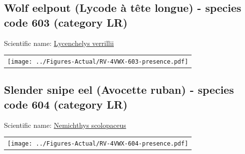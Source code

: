 \documentclass[12pt]{article}\usepackage[]{graphicx}\usepackage[]{color}
\begin{document}
\renewcommand\thefigure{\thesubsection\Alph{figure}}

\setcounter{figure}{0}

\hypertarget{sec:603}{%
\subsection{Wolf eelpout (Lycode à tête longue) - species code 603 (category LR)}\label{sec:603}}

  


Scientific name: \href{http://www.marinespecies.org/aphia.php?p=taxdetails\&id=159258}{Lycenchelys verrillii} \newline
\begin{minipage}{1.0\textwidth}
 \begin{tabular}{c}
\texttt{[image: ../Figures-Actual/RV-4VWX-603-presence.pdf]} \\ 
\end{tabular} 
\end{minipage}
\clearpage

\renewcommand\thefigure{\thesubsection\Alph{figure}}

\setcounter{figure}{0}

\hypertarget{sec:604}{%
\subsection{Slender snipe eel (Avocette ruban) - species code 604 (category LR)}\label{sec:604}}

  


Scientific name: \href{http://www.marinespecies.org/aphia.php?p=taxdetails\&id=126306}{Nemichthys scolopaceus} \newline
\begin{minipage}{1.0\textwidth}
 \begin{tabular}{c}
\texttt{[image: ../Figures-Actual/RV-4VWX-604-presence.pdf]} \\ 
\end{tabular} 
\end{minipage}
\clearpage
\end{document}
